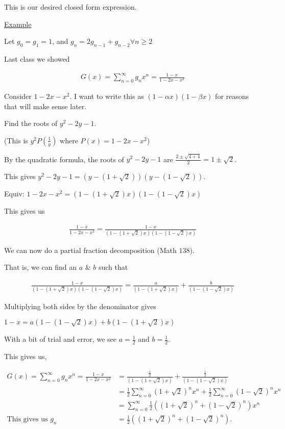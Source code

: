 \documentclass{article}
\begin{document}
This is our desired closed form expression.

\underline{Example}

Let $g_0 = g_1 = 1$, and $g_n = 2g_{n-1} + g_{n-2} \forall n \ge 2$

Last class we showed 

\begin{align*}
    G(x) = \sum_{n=0}^{\infty}g_nx^n = \frac{1-x}{1-2x-x^2}
\end{align*}

Consider $1-2x-x^2$. I want to write this as $(1-\alpha x)(1 - \beta x)$ for reasons that will make sense later.

Find the roots of $y^2 - 2y - 1$.

(This is $y^2P(\frac{1}{y})$ where $P(x) = 1 - 2x - x^2$)

By the quadratic formula, the roots of $y^2 - 2y - 1$ are $\frac{2 \pm \sqrt{4+4}}{2} = 1 \pm \sqrt{2}$.

This gives $y^2 - 2y - 1 = (y - (1 + \sqrt{2}))(y-(1-\sqrt{2}))$.

Equiv: $1-2x-x^2 = (1-(1+\sqrt{2})x)(1-(1-\sqrt{2})x)$

This gives us 

\begin{align*}
    \frac{1-x}{1-2x-x^2} = \frac{1-x}{(1-(1+\sqrt{2})x)(1-(1-\sqrt{2})x)}
\end{align*}

We can now do a partial fraction decomposition (Math $138$).

That is, we can find an $a$ \& $b$ such that

\begin{align*}
    \frac{1-x}{(1-(1+\sqrt{2})x)(1-(1-\sqrt{2})x)} = \frac{a}{(1-(1+\sqrt{2})x)} + \frac{b}{(1-(1-\sqrt{2})x)}
\end{align*}

Multiplying both sides by the denominator gives 

$1-x = a(1-(1-\sqrt{2})x) + b(1-(1+\sqrt{2})x)$

With a bit of trial and error, we see $a = \frac{1}{2}$ and $b = \frac{1}{2}$.

This gives us,

\begin{align*}
    G(x) = \sum_{n=0}^{\infty}g_nx^n = \frac{1-x}{1-2x-x^2} &= \frac{\frac{1}{2}}{(1-(1+\sqrt{2})x)} + \frac{\frac{1}{2}}{(1-(1-\sqrt{2})x)} \\ 
    &= \frac{1}{2} \sum_{n=0}^{\infty}(1+\sqrt{2})^n x^n + \frac{1}{2} \sum_{n=0}^{\infty}(1-\sqrt{2})^n x^n \\
    &= \sum_{n=0}^{\infty} \frac{1}{2} ((1+\sqrt{2})^n + (1-\sqrt{2})^n)x^n \\ 
    \text{This gives us } g_n &= \frac{1}{2}((1+\sqrt{2})^n + (1-\sqrt{2})^n).
\end{align*}
\end{document}
